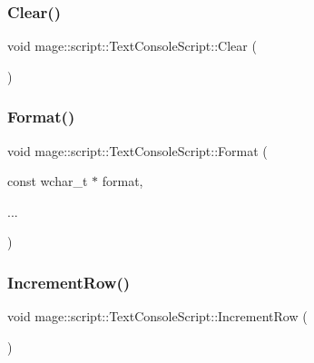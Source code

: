 \subsubsection{\texorpdfstring{Clear()}{Clear()}}
{\footnotesize\ttfamily void mage\+::script\+::\+Text\+Console\+Script\+::\+Clear (\begin{DoxyParamCaption}{ }\end{DoxyParamCaption})}

\hypertarget{classmage_1_1script_1_1_text_console_script_a4c956a26976c553a20b4c3b1ec5e9e6b}{}\label{classmage_1_1script_1_1_text_console_script_a4c956a26976c553a20b4c3b1ec5e9e6b} 
\subsubsection{\texorpdfstring{Format()}{Format()}}
{\footnotesize\ttfamily void mage\+::script\+::\+Text\+Console\+Script\+::\+Format (\begin{DoxyParamCaption}\item[{const wchar\+\_\+t $\ast$}]{format,  }\item[{}]{... }\end{DoxyParamCaption})}

\hypertarget{classmage_1_1script_1_1_text_console_script_a3d4cba4fd8a2733933a7a444c6beaf1a}{}\label{classmage_1_1script_1_1_text_console_script_a3d4cba4fd8a2733933a7a444c6beaf1a} 
\subsubsection{\texorpdfstring{Increment\+Row()}{IncrementRow()}}
{\footnotesize\ttfamily void mage\+::script\+::\+Text\+Console\+Script\+::\+Increment\+Row (\begin{DoxyParamCaption}{ }\end{DoxyParamCaption})\hspace{0.3cm}{\ttfamily [private]}}

\hypertarget{classmage_1_1script_1_1_text_console_script_aaa7ab7c1859adc6532b6191c205d44ef}{}\label{classmage_1_1script_1_1_text_console_script_aaa7ab7c1859adc6532b6191c205d44ef} 
